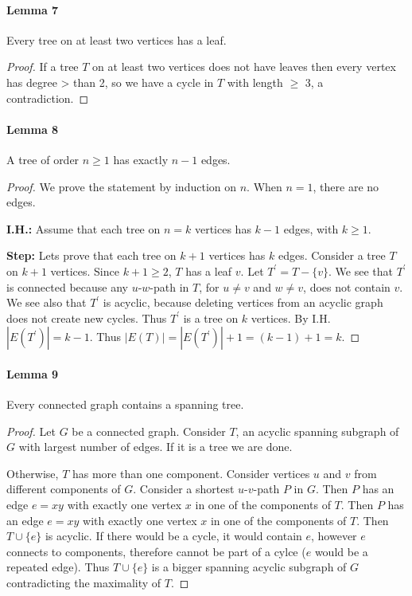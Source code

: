 \paragraph{Lemma 7} Every tree on at least two vertices has a leaf.
\begin{proof}
    If a tree $ T $ on at least two vertices does not have leaves
    then every vertex has degree > than 2, so we have a cycle in $ T $ 
    with length $ \geq $ 3, a contradiction.
\end{proof}

\paragraph{Lemma 8} A tree of order $ n \geq 1 $ has exactly $ n - 1 $ edges.
\begin{proof}
    We prove the statement by induction on $ n$. When $ n = 1$, there are no edges.

    \smallskip
    \noindent\textbf{I.H.:} Assume that each tree on $ n = k $ vertices has 
    $ k - 1 $ edges, with $ k \geq 1 $.
    
    \smallskip
    \noindent\textbf{Step:} Lets prove that each tree on $ k+1 $ vertices has $ k $ edges.
    Consider a tree $ T $ on $ k + 1 $ vertices. Since $ k + 1 \geq 2 $, $ T $ has 
    a leaf $ v $. Let $ T^\prime = T - \{v\}$. We see that $ T^\prime $ is connected
    because any $u$-$w$-path in $ T $, for $ u \neq v $ and $ w \neq v $, does not 
    contain $ v $. We see also that $ T^\prime $ is acyclic, because deleting 
    vertices from an acyclic graph does not create new cycles. Thus $ T^\prime $ 
    is a tree on $ k $ vertices. By I.H. $ |E(T^\prime)| = k-1$. Thus 
    $ |E(T)| = |E(T^\prime)| + 1 = (k-1)+1 = k.$

\end{proof}

\paragraph{Lemma 9} Every connected graph contains a spanning tree.
\begin{proof}
    Let $ G $ be a connected graph. Consider $ T $, an acyclic spanning subgraph of 
    $ G $ with largest number of edges. If it is a tree we are done.

    \smallskip
    Otherwise, $ T $ has more than one component. Consider vertices $ u $ and 
    $ v $ from different components of $ G$. Consider a shortest $u$-$v$-path $ P $
    in $ G$. Then $ P $ has an edge $ e = xy $ with exactly one vertex $ x $ in 
    one of the components of $ T$. Then $ P $ has an edge $ e = xy $ with exactly
    one vertex $ x $ in one of the components of $ T$. Then $ T \cup \{e\} $ is 
    acyclic. If there would be a cycle, it would contain $ e $, however $ e $ connects
    to components, therefore cannot be part of a cylce ($ e $ would be a repeated 
    edge). Thus $ T \cup \{e\} $ is a bigger spanning acyclic subgraph of $ G $
    contradicting the maximality of $ T $.
\end{proof}

